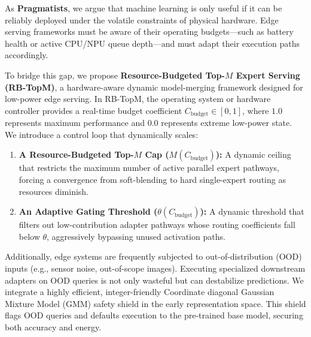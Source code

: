As \textbf{Pragmatists}, we argue that machine learning is only useful if it can be reliably deployed under the volatile constraints of physical hardware. Edge serving frameworks must be aware of their operating budgets—such as battery health or active CPU/NPU queue depth—and must adapt their execution paths accordingly. 

To bridge this gap, we propose \textbf{Resource-Budgeted Top-$M$ Expert Serving (RB-TopM)}, a hardware-aware dynamic model-merging framework designed for low-power edge serving. In RB-TopM, the operating system or hardware controller provides a real-time budget coefficient $C_{\text{budget}} \in [0, 1]$, where $1.0$ represents maximum performance and $0.0$ represents extreme low-power state. We introduce a control loop that dynamically scales:
\begin{enumerate}
    \item \textbf{A Resource-Budgeted Top-$M$ Cap ($M(C_{\text{budget}})$):} A dynamic ceiling that restricts the maximum number of active parallel expert pathways, forcing a convergence from soft-blending to hard single-expert routing as resources diminish.
    \item \textbf{An Adaptive Gating Threshold ($\theta(C_{\text{budget}})$):} A dynamic threshold that filters out low-contribution adapter pathways whose routing coefficients fall below $\theta$, aggressively bypassing unused activation paths.
\end{enumerate}
Additionally, edge systems are frequently subjected to out-of-distribution (OOD) inputs (e.g., sensor noise, out-of-scope images). Executing specialized downstream adapters on OOD queries is not only wasteful but can destabilize predictions. We integrate a highly efficient, integer-friendly Coordinate diagonal Gaussian Mixture Model (GMM) safety shield in the early representation space. This shield flags OOD queries and defaults execution to the pre-trained base model, securing both accuracy and energy.

